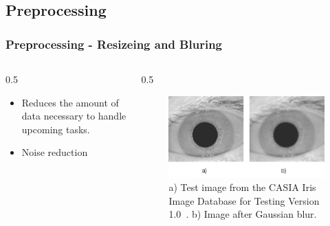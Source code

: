 \documentclass{beamer}
\begin{document}
\subsection{Preprocessing}
\begin{frame}
    [fragile] \frametitle{Preprocessing - Resizeing and Bluring}
    \begin{columns}
        \begin{column}
            {0.5
            \textwidth}
            \begin{itemize}
                \item Reduces the amount of data necessary to handle upcoming tasks.
                \item Noise reduction
            \end{itemize}
        \end{column}
        \begin{column}
            {0.5
            \textwidth}
            \begin{figure}
                [ht] \centering
                \includegraphics[width=0.99
                \textwidth]{../report/iris/resized.jpg} \caption{a) Test image from the CASIA Iris Image Database for Testing Version 1.0~\cite{ir-testv1}. b) Image after Gaussian blur.} \label{fig:input}
            \end{figure}
        \end{column}
    \end{columns}
\end{frame}
\end{document}
